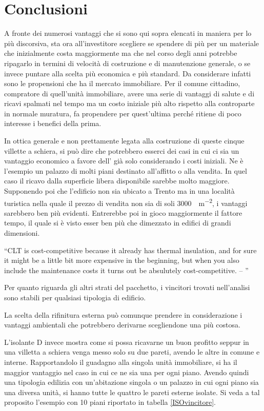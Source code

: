 \section{Conclusioni}
A fronte dei numerosi vantaggi che si sono qui sopra elencati in maniera per lo più discorsiva, sta ora all'investitore scegliere se spendere di più per un materiale che inizialmente costa maggiormente ma che nel corso degli anni potrebbe ripagarlo in termini di velocità di costruzione e di manutenzione generale, o se invece puntare alla scelta più economica e più standard.
Da considerare infatti sono le propensioni che ha il mercato immobiliare. 
Per il comune cittadino, compratore di quell'unità immobiliare, avere una serie di vantaggi di salute e di ricavi spalmati nel tempo ma un costo iniziale più alto rispetto alla controparte in normale muratura, fa propendere per quest'ultima perché ritiene di poco interesse i benefici della prima.

In ottica generale e non prettamente legata alla costruzione di queste cinque villette a schiera, si può dire che potrebbero esserci dei casi in cui ci sia un vantaggio economico a favore dell'\xlam{} già solo considerando i costi iniziali. 
Ne è l'esempio un palazzo di molti piani destinato all'affitto o alla vendita.
In quel caso il ricavo dalla superficie libera disponibile sarebbe molto maggiore.
Supponendo poi che l'edificio non sia ubicato a Trento ma in una località turistica nella quale il prezzo di vendita non sia di soli \SI{3000}{\teuro \per \square\metre}, i vantaggi sarebbero ben più evidenti.
Entrerebbe poi in gioco maggiormente il fattore tempo, il quale si è visto esser ben più che dimezzato in edifici di grandi dimensioni.


\vspace{1cm}
\noindent \enquote{CLT is cost-competitive because it already has thermal insulation, \omissis{} and for sure it might be a little bit more expensive in the beginning, but when you also include the maintenance costs it turns out be absulutely cost-competitive. -- \textcite{mallo_outlook_2014}}

\vspace{1cm}
Per quanto riguarda gli altri strati del pacchetto, i vincitori trovati nell'analisi sono stabili per qualsiasi tipologia di edificio.

La scelta della rifinitura esterna può comunque prendere in considerazione i vantaggi ambientali che potrebbero derivarne scegliendone una più costosa.

L'isolante D invece mostra come si possa ricavarne un buon profitto seppur in una villetta a schiera venga messo solo su due pareti, avendo le altre in comune e interne. 
Rapportandolo il guadagno alla singola unità immobiliare, si ha il maggior vantaggio nel caso in cui ce ne sia una per ogni piano. 
Avendo quindi una tipologia edilizia con un'abitazione singola o un palazzo in cui ogni piano sia una diversa unità, si hanno tutte le quattro le pareti esterne isolate. 
Si veda a tal proposito l'esempio con 10 piani riportato in tabella \ref{ISOvincitore}.
